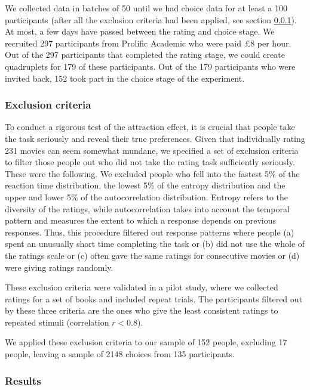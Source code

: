 \documentclass[12pt, a4paper]{article}
\begin{document}
We collected data in batches of 50 until we had choice data for at least a 100 participants (after all the exclusion criteria had been applied, see section \ref{exclusion_ref}). At most, a few days have passed between the rating and choice stage. We recruited 297 participants from Prolific Academic who were paid £8 per hour. Out of the 297 participants that completed the rating stage, we could create quadruplets for 179 of these participants. Out of the 179 participants who were invited back, 152 took part in the choice stage of the experiment.

\subsubsection{Exclusion criteria} \label{exclusion_ref}

To conduct a rigorous test of the attraction effect, it is crucial that people take the task seriously and reveal their true preferences. Given that individually rating 231 movies can seem somewhat mundane, we specified a set of exclusion criteria to filter those people out who did not take the rating task sufficiently seriously. These were the following. We excluded people who fell into the fastest 5\% of the reaction time distribution, the lowest 5\% of the entropy distribution and the upper and lower 5\% of the autocorrelation distribution. Entropy refers to the diversity of the ratings, while autocorrelation takes into account the temporal pattern and measures the extent to which a response depends on previous responses. Thus, this procedure filtered out response patterns where people (a) spent an unusually short time completing the task or (b) did not use the whole of the ratings scale or (c) often gave the same ratings for consecutive movies or (d) were giving ratings randomly.

These exclusion criteria were validated in a pilot study, where we collected ratings for a set of books and included repeat trials. The participants filtered out by these three criteria are the ones who give the least consistent ratings to repeated stimuli (correlation $r < 0.8$).

We applied these exclusion criteria to our sample of 152 people, excluding 17 people, leaving a sample of 2148 choices from 135 participants.


\subsubsection{Results}
\end{document}
